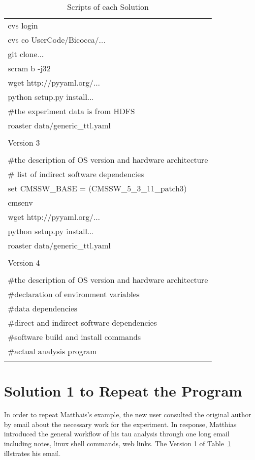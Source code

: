 \documentclass{acm_proc_article-sp}
\begin{document}
\begin{table}
\begin{tabular}{|l|}
        cvs login \\
        cvs co UserCode/Bicocca/... \\
        git clone... \\
        scram b -j32 \\
        wget http://pyyaml.org/... \\
        python setup.py install... \\
        \#the experiment data is from HDFS \\
        roaster data/generic\_ttl.yaml \\ 
        \\ \hline
        Version 3\\ \hline
        \\
        \#the description of OS version and hardware architecture \\
        \# list of indirect software dependencies \\
        set CMSSW\_BASE = (CMSSW\_5\_3\_11\_patch3) \\ 
        cmsenv \\
        wget http://pyyaml.org/... \\
        python setup.py install... \\
        roaster data/generic\_ttl.yaml \\
        \\ \hline
        Version 4\\ \hline
        \\
        \#the description of OS version and hardware architecture \\
        \#declaration of environment variables\\
        \#data dependencies\\
        \#direct and indirect software dependencies\\
        \#software build and install commands\\
        \#actual analysis program\\ 
        \\ \hline
    \end{tabular}
    \caption{Scripts of each Solution}
    \label{table:scripts}
\end{table}

\section{Solution 1 to Repeat the Program}
In order to repeat Matthais's example, the new user consulted the original author by email about the necessary work for the experiment. In response, Matthias introduced the general workflow of his tau analysis through one long email including notes, linux shell commands, web links. The Version 1 of Table~\ref{table:scripts} illstrates his email.
\end{document}
